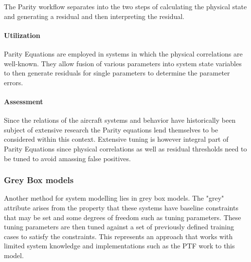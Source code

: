 The Parity workflow separates into the two steps of calculating the physical state and generating a residual and then interpreting the residual.

\paragraph{Utilization}

Parity Equations are employed in systems in which the physical correlations are well-known. They allow fusion of various parameters into system state variables to then generate residuals for single parameters to determine the parameter errors.

\paragraph{Assessment}
Since the relations of the aircraft systems and behavior have historically been subject of extensive research the Parity equations lend themselves to be considered within this context. Extensive tuning is however integral part of Parity Equations since physical correlations as well as residual thresholds need to be tuned to avoid amassing false positives.

\subsubsection{Grey Box models}

Another method for system modelling lies in grey box models. The "grey" attribute arises from the property that these systems have baseline constraints that may be set and some degrees of freedom such as tuning parameters. These tuning parameters are then tuned against a set of previously defined training cases to satisfy the constraints. This represents an approach that works with limited system knowledge and implementations such as the PTF work to this model.




